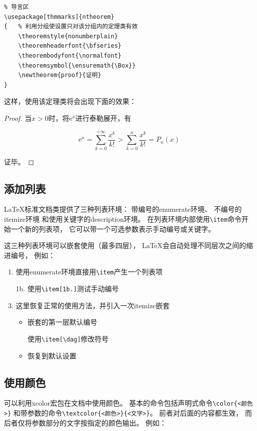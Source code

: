 \documentclass{ctexart}
\numberwithin{equation}{section}			%
\begin{document}
\begin{lstlisting}
% 导言区
\usepackage[thmmarks]{ntheorem}
{	% 利用分组使设置只对该分组内的定理类有效
	\theoremstyle{nonumberplain}
	\theoremheaderfont{\bfseries}
	\theorembodyfont{\normalfont}
	\theoremsymbol{\ensuremath{\Box}}
	\newtheorem{proof}{证明}
}
\end{lstlisting}
	
	这样，使用该定理类将会出现下面的效果：
	
	\begin{proof}
		当$x>0$时，将$\mathrm{e}^x$进行泰勒展开，有
		
		\[
			\mathrm{e}^x = \sum_{k=0}^{+\infty} \frac{x^k}{k!} 
			>\sum_{k=0}^{n} \frac{x^k}{k!}=P_n(x)
		\]
		
		证毕。
	\end{proof}
	
	\subsection{添加列表}
	\LaTeX 标准文档类提供了三种列表环境：
	带编号的enumerate环境、
	不编号的itemize环境
	和使用关键字的description环境。
	在列表环境内部使用\verb|\item|命令开始一个新的列表项，
	它可以带一个可选参数表示手动编号或关键字。
	
	这三种列表环境可以嵌套使用（最多四层），
	\LaTeX 会自动处理不同层次之间的缩进编号，
	例如：
	
	\begin{enumerate}
		\item 使用enumerate环境直接用\verb|\item|产生一个列表项
		\item[1b.] 使用\verb|\item[1b.]|测试手动编号
		\item 这里恢复正常的使用方法，并引入一次itemize嵌套
		\begin{itemize}
			\item 嵌套的第一层默认编号
			\item[\dag] 使用\verb|\item[\dag]|修改符号
			\item 恢复到默认设置
		\end{itemize}
	\end{enumerate}
	
	\subsection{使用颜色}
	可以利用xcolor宏包在文档中使用颜色。
	基本的命令包括声明式命令\verb|\color{<颜色>}|
	和带参数的命令\verb|\textcolor{<颜色>}{<文字>}|。
	前者对后面的内容都生效，
	而后者仅将参数部分的文字按指定的颜色输出。
	例如：
	
\end{document}
